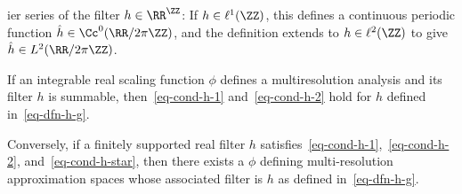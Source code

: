 ier series of the filter $h \in \RR^\ZZ$:
If $h \in \ell^1(\ZZ)$, this defines a continuous periodic function $\hat h \in \Cc^0(\RR/2\pi\ZZ)$, and the definition extends to $h \in \ell^2(\ZZ)$ to give $\hat h \in L^2(\RR/2\pi\ZZ)$.

\begin{thm}\label{thm-multires-approx}
	If an integrable real scaling function $\phi$ defines a multiresolution analysis and its filter $h$ is summable, then~\eqref{eq-cond-h-1} and~\eqref{eq-cond-h-2} hold for $h$ defined in~\eqref{eq-dfn-h-g}.
	 
	Conversely, if a finitely supported real filter $h$ satisfies~\eqref{eq-cond-h-1},~\eqref{eq-cond-h-2}, and~\eqref{eq-cond-h-star}, then there exists a $\phi$ defining multi-resolution approximation spaces whose associated filter is $h$ as defined in~\eqref{eq-dfn-h-g}.
\end{thm}

